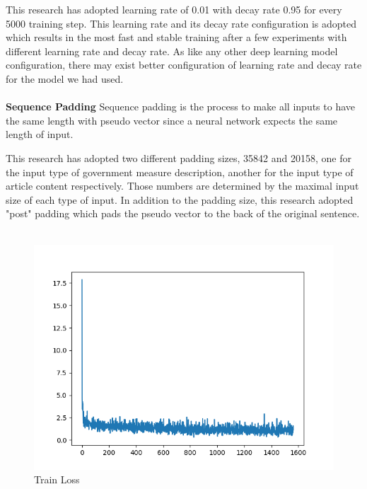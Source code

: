 \documentclass[sigconf]{acmart}
\begin{document}
This research has adopted learning rate of 0.01 with decay rate 0.95 for every 5000 training step. This learning rate and its decay rate configuration is adopted which results in the most fast and stable training after a few experiments with different learning rate and decay rate. As like any other deep learning model configuration, there may exist better configuration of learning rate and decay rate for the model we had used. \\\\
\textbf{Sequence Padding} Sequence padding is the process to make all inputs to have the same length with pseudo vector since a neural network expects the same length of input. 

This research has adopted two different padding sizes, 35842 and 20158, one for the input type of government measure description, another for the input type of article content respectively. Those numbers are determined by the maximal input size of each type of input. In addition to the padding size, this research adopted "post" padding which pads the pseudo vector to the back of the original sentence.\\\\

\begin{figure}
  \includegraphics[width=1.1\linewidth]{trainLoss.png}
  \caption{Train Loss}
  \label{trainFig}
\end{figure}
\end{document}
